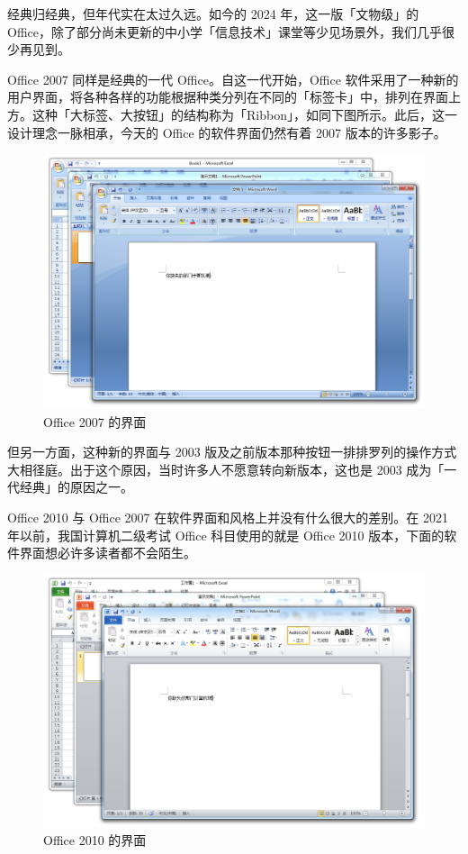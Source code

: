 经典归经典，但年代实在太过久远。如今的 2024 年，这一版「文物级」的 Office，除了部分尚未更新的中小学「信息技术」课堂等少见场景外，我们几乎很少再见到。

Office 2007 同样是经典的一代 Office。自这一代开始，Office 软件采用了一种新的用户界面，将各种各样的功能根据种类分列在不同的「标签卡」中，排列在界面上方。这种「大标签、大按钮」的结构称为「Ribbon」，如同下图所示。此后，这一设计理念一脉相承，今天的 Office 的软件界面仍然有着 2007 版本的许多影子。

\begin{figure}[htb!]
  \centering
  \includegraphics[width=.8\textwidth]{assets/software/Office_2007.png}
  \caption{Office 2007 的界面}
  \label{fig:Office_2007}
\end{figure}

但另一方面，这种新的界面与 2003 版及之前版本那种按钮一排排罗列的操作方式大相径庭。出于这个原因，当时许多人不愿意转向新版本，这也是 2003 成为「一代经典」的原因之一。

Office 2010 与 Office 2007 在软件界面和风格上并没有什么很大的差别。在 2021 年以前，我国计算机二级考试 Office 科目使用的就是 Office 2010 版本，下面的软件界面想必许多读者都不会陌生。

\begin{figure}[htb!]
  \centering
  \includegraphics[width=.8\textwidth]{assets/software/Office_2010.png}
  \caption{Office 2010 的界面}
  \label{fig:Office_2010}
\end{figure}

